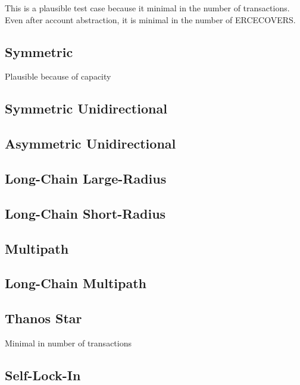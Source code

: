 \documentclass{article}
\begin{document}
This is a plausible test case because it minimal in the number of transactions. Even after account abstraction, it is minimal in the number of ERCECOVERS.

\subsection*{Symmetric}

Plausible because of capacity

\subsection*{Symmetric Unidirectional}
\subsection*{Asymmetric Unidirectional}

\subsection*{Long-Chain Large-Radius}
\subsection*{Long-Chain Short-Radius}
\subsection*{Multipath}
\subsection*{Long-Chain Multipath}
\subsection*{Thanos Star}

Minimal in number of transactions

\subsection*{Self-Lock-In}
\end{document}
